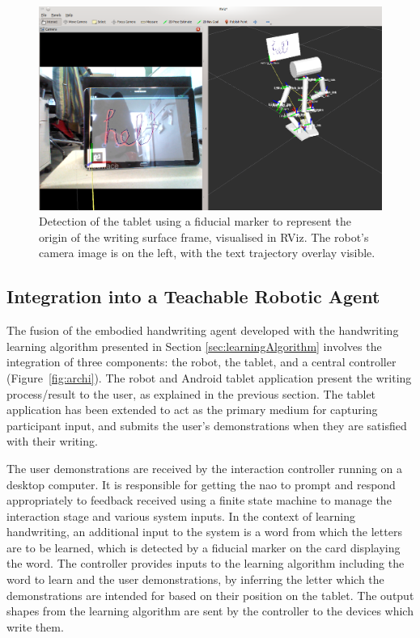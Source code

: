 \documentclass{sig-alternate}
\begin{document}
\begin{figure}[htpb]
    \centering
    \includegraphics[width=0.9\columnwidth]{figures/chilitagDetection_cameraOverlay.png}
    \caption{\label{fig:tabletDetection}Detection of the tablet using a fiducial
    marker to represent the origin of the writing surface frame, visualised in RViz. The robot's
    camera image is on the left, with the text trajectory overlay visible.}

\end{figure}


\subsection{Integration into a Teachable Robotic Agent}

The fusion of the embodied handwriting agent developed with the handwriting
learning algorithm presented in Section \ref{sec:learningAlgorithm} involves the
integration of three components: the robot, the tablet, and a central controller
(Figure~\ref{fig:archi}). The robot and Android tablet application present the
writing process/result to the user, as explained in the previous section.
The tablet application has been extended to act as the primary medium for
capturing participant input, and submits the user's demonstrations when they are
satisfied with their writing. 

The user demonstrations are received by the
interaction controller running on a desktop computer. It is responsible for
getting the {\sc nao} to prompt and respond appropriately to feedback received using
a finite state machine to manage the interaction stage and various system
inputs. In the context of learning handwriting, an additional input to the system 
is a word from which the letters are to be learned, which is detected by a fiducial 
marker on the card displaying the word.
The controller provides inputs to the learning algorithm including the word to learn
and the user demonstrations, by inferring the letter which the demonstrations are 
intended for based on their position on the tablet. The output shapes from the 
learning algorithm are sent by the controller to the devices which write them.
\end{document}
